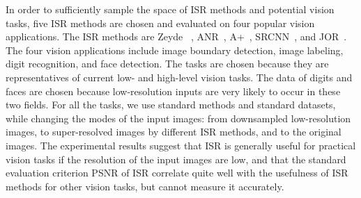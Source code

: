 \documentclass[10pt,twocolumn,letterpaper]{article}
\begin{document}

In order to sufficiently sample the space of ISR methods and potential
vision tasks, five ISR methods are chosen and evaluated on four popular
vision applications. The ISR methods are Zeyde
\etal~\cite{Zeyde-CS-2012}, ANR~\cite{Timofte-ICCV-2013},
A+~\cite{Timofte-ACCV-2014}, SRCNN~\cite{Dong-ECCV-2014}, and
JOR~\cite{JOR:EG15}. 
The four vision
applications include image boundary detection, image labeling, digit recognition, and face detection. The tasks are chosen 
because they are representatives of current low- and high-level vision
tasks. The data of digits and faces are chosen because low-resolution
inputs are very likely to occur in these two fields. For all the
tasks, we use standard methods and standard datasets, while changing
the modes of the input images: from downsampled low-resolution images,
to super-resolved images by different ISR methods, and to the original
images. The experimental results suggest that ISR is generally useful
for practical vision tasks if the resolution of the input images are
low, and that the standard evaluation criterion PSNR of ISR correlate quite
well with the usefulness of ISR methods for other vision tasks, but
cannot measure it accurately. 

\end{document}
